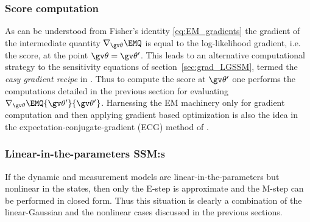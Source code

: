 \subsubsection{Score computation}%

As can be understood from Fisher's identity \eqref{eq:EM_gradients}
the gradient of the intermediate quantity $\nabla_{\Th}\EMQ$ is equal to the log-likelihood
gradient, i.e. the score, at the point $\Th=\Th'$. This leads to an alternative computational
strategy to the sensitivity equations of section~\ref{sec:grad_LGSSM}, termed
the \emph{easy gradient recipe} in \textcite{Olsson2007}. Thus to compute the score
at $\Th'$ one performs the computations detailed in the previous section for evaluating
$\nabla_{\Th}\EMQ{\Th'}{\Th'}$. Harnessing the EM machinery only for gradient computation and then applying
gradient based optimization is also the idea in the expectation-conjugate-gradient (ECG) 
method of \textcite{Salakhutdinov2003a}. 


\subsubsection*{Linear-in-the-parameters SSM:s}%
\label{sec:litp}

If the dynamic and measurement models are linear-in-the-parameters but nonlinear
in the states, then only the E-step is approximate and the M-step can be performed
in closed form. Thus this situation is clearly a combination of the linear-Gaussian
and the nonlinear cases discussed in the previous sections.

